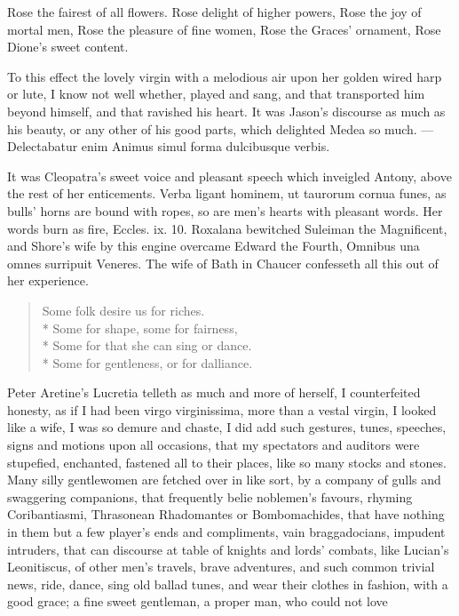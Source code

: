 {Rose the fairest of all flowers.
Rose delight of higher powers,
Rose the joy of mortal men,
Rose the pleasure of fine women,
Rose the Graces' ornament,
Rose Dione's sweet content.

To this effect the lovely virgin with a melodious air upon her golden
wired harp or lute, I know not well whether, played and sang, and that
transported him beyond himself, and that ravished his heart. It was
Jason's discourse as much as his beauty, or any other of his good
parts, which delighted Medea so much.
---Delectabatur enim
Animus simul forma dulcibusque verbis.

It was Cleopatra's sweet voice and pleasant speech which inveigled
Antony, above the rest of her enticements. Verba ligant hominem, ut
taurorum cornua funes, as bulls' horns are bound with ropes, so are
men's hearts with pleasant words. Her words burn as fire, Eccles. ix.
10. Roxalana bewitched Suleiman the Magnificent, and Shore's wife by
this engine overcame Edward the Fourth, Omnibus una omnes
surripuit Veneres. The wife of Bath in Chaucer confesseth all this out
of her experience.
%
{\gothfont
\begin{verse}
Some folk desire us for riches.\\*
Some for shape, some for fairness,\\*
Some for that she can sing or dance.\\*
Some for gentleness, or for dalliance.
\end{verse}
}
%
Peter Aretine's Lucretia telleth as much and more of herself, I
counterfeited honesty, as if I had been virgo virginissima, more than a
vestal virgin, I looked like a wife, I was so demure and chaste, I did
add such gestures, tunes, speeches, signs and motions upon all
occasions, that my spectators and auditors were stupefied, enchanted,
fastened all to their places, like so many stocks and stones. Many
silly gentlewomen are fetched over in like sort, by a company of gulls
and swaggering companions, that frequently belie noblemen's favours,
rhyming Coribantiasmi, Thrasonean Rhadomantes or Bombomachides, that
have nothing in them but a few player's ends and compliments, vain
braggadocians, impudent intruders, that can discourse at table of
knights and lords' combats, like Lucian's Leonitiscus, of other
men's travels, brave adventures, and such common trivial news, ride,
dance, sing old ballad tunes, and wear their clothes in fashion, with a
good grace; a fine sweet gentleman, a proper man, who could not love
}
